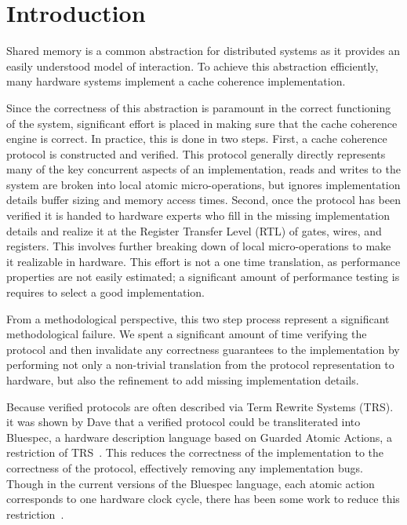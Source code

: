\section{Introduction}
\label{sec:Introduction}

Shared memory is a common abstraction for distributed systems as it
provides an easily understood model of interaction. To achieve this
abstraction efficiently, many hardware systems implement a cache
coherence implementation. 

Since the correctness of this abstraction is paramount in the correct
functioning of the system, significant effort is placed in making sure
that the cache coherence engine is correct. In practice, this is done
in two steps. First, a cache coherence protocol is constructed and
verified. This protocol generally directly represents many of
the key concurrent aspects of an implementation, \eg{} reads and
writes to the system are broken into local atomic micro-operations, but
ignores implementation details \eg{} buffer sizing and memory access
times. Second, once the protocol has been verified it is handed to
hardware experts who fill in the missing implementation details and
realize it at the Register Transfer Level (RTL) of gates, wires, and
registers. This involves further breaking down of local micro-operations to
make it realizable in hardware. This effort is not a one time translation, as
performance properties are not easily estimated; a significant amount of
performance testing is requires to select a good implementation. 

From a methodological perspective, this two step process represent a
significant methodological failure. We spent a significant amount of
time verifying the protocol and then invalidate any correctness
guarantees to the implementation by performing not only a non-trivial
translation from the protocol representation to hardware, but also
the refinement to add missing implementation details.

Because verified protocols are often described via Term Rewrite
Systems (TRS).  it was shown by Dave \etal{} that a verified protocol
could be transliterated into Bluespec, a hardware description language
based on Guarded Atomic Actions, a restriction of
TRS~\cite{Hoe:TCAD,DNA:CoherenceImplementation}. This reduces the
correctness of the implementation to the correctness of the protocol,
effectively removing any implementation bugs. Though in the current
versions of the Bluespec language, each atomic action corresponds to
one hardware clock cycle, there has been some work to reduce this
restriction~\cite{Karczmarek}.


